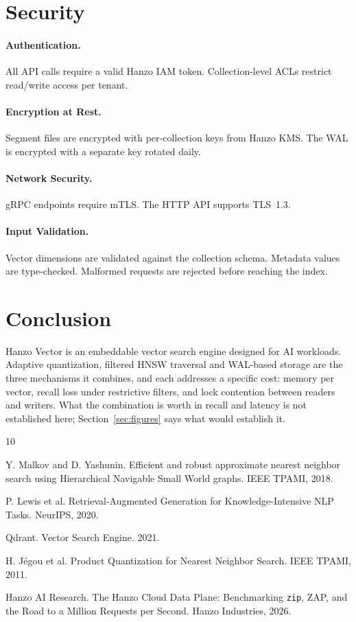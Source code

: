 \documentclass[11pt,twocolumn]{article}
\begin{document}
\section{Security}

\paragraph{Authentication.} All API calls require a valid Hanzo IAM token. Collection-level ACLs restrict read/write access per tenant.

\paragraph{Encryption at Rest.} Segment files are encrypted with per-collection keys from Hanzo KMS. The WAL is encrypted with a separate key rotated daily.

\paragraph{Network Security.} gRPC endpoints require mTLS. The HTTP API supports TLS~1.3.

\paragraph{Input Validation.} Vector dimensions are validated against the collection schema. Metadata values are type-checked. Malformed requests are rejected before reaching the index.

\section{Conclusion}

Hanzo Vector is an embeddable vector search engine designed for AI workloads. Adaptive quantization, filtered HNSW traversal and WAL-based storage are the three mechanisms it combines, and each addresses a specific cost: memory per vector, recall loss under restrictive filters, and lock contention between readers and writers. What the combination is worth in recall and latency is not established here; Section~\ref{sec:figures} says what would establish it.


\begin{thebibliography}{10}

Y. Malkov and D. Yashunin. Efficient and robust approximate nearest neighbor search using Hierarchical Navigable Small World graphs. IEEE TPAMI, 2018.

P. Lewis et al. Retrieval-Augmented Generation for Knowledge-Intensive NLP Tasks. NeurIPS, 2020.

Qdrant. Vector Search Engine. 2021.

H. J\'{e}gou et al. Product Quantization for Nearest Neighbor Search. IEEE TPAMI, 2011.

Hanzo AI Research. The Hanzo Cloud Data Plane: Benchmarking \texttt{zip}, ZAP, and the Road to a Million Requests per Second. Hanzo Industries, 2026.

\end{thebibliography}
\end{document}
